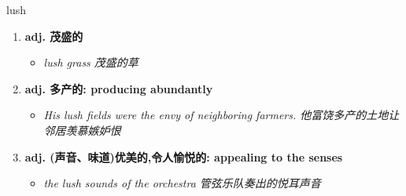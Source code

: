 
\begin{frame}
{\huge lush}
\begin{center}
\begin{enumerate}\Large
  \item \textbf{adj. 茂盛的}
  \begin{itemize}
    \item \em{\Large{lush grass 茂盛的草}}
  \end{itemize}
  \item \textbf{adj. 多产的: producing abundantly}
  \begin{itemize}
    \item \em{\Large{His lush fields were the envy of neighboring farmers. 他富饶多产的土地让邻居羡慕嫉妒恨}}
  \end{itemize}
  \item \textbf{adj. (声音、味道)优美的,令人愉悦的: appealing to the senses}
  \begin{itemize}
    \item \em{\Large{the lush sounds of the orchestra 管弦乐队奏出的悦耳声音}}
  \end{itemize}
\end{enumerate}
\end{center}
\end{frame}
